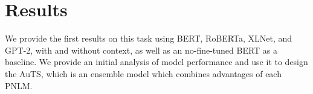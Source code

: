 \documentclass[11pt]{article}
\begin{document}
\begin{table}
    \centering
    \caption{An example of sentence pair in Medical Wikipedia parallel corpus.}
    \label{tab:medexample}
\end{table}

\begin{table}
    \centering
    \caption{Number of sentence pairs for General Domain and Medical Domain. The two corpora are exclusive.}
    \label{tab:medsize}
\end{table}

\section{Results} \label{sec:results}

We provide the first results on this task using BERT, RoBERTa, XLNet, and GPT-2, with and without context, as well as an no-fine-tuned BERT as a baseline. We provide an initial analysis of model performance and use it to design the AuTS, which is an ensemble model which combines advantages of each PNLM.
\end{document}
